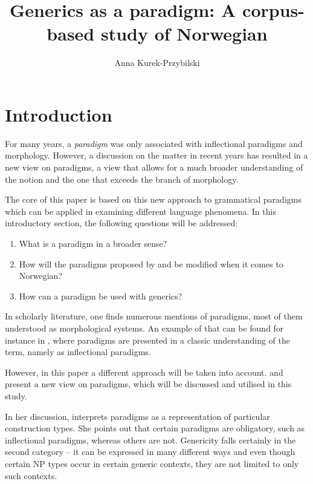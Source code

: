 \documentclass[output=paper]{langsci/langscibook}
\author{Anna Kurek-Przybilski\affiliation{Adam Mickiewicz University Poznań}}
\title{Generics as a paradigm: A corpus-based study of Norwegian}
\begin{document}
\maketitle
\section{Introduction}
For many years, a \textit{paradigm} was only associated with inflectional paradigms and morphology. However, a discussion on the matter in recent years has resulted in a new view on paradigms, a view that allows for a much broader understanding of the notion and the one that exceeds the branch of morphology.

The core of this paper is based on this new approach to grammatical paradigms which can be applied in examining different language phenomena. In this introductory section, the following questions will be addressed:

\begin{enumerate}[noitemsep]
    \item What is a paradigm in a broader sense?
    \item How will the paradigms proposed by \citet{Radden2007,Radden2009} and \citet{Pettersson1976} be modified when it comes to Norwegian?
    \item How can a paradigm be used with generics?
\end{enumerate}

In scholarly literature, one finds numerous mentions of paradigms, most of them understood as morphological systems. An example of that can be found for instance in \citet[55]{AckermanBlevinsMalouf2009}, where paradigms are presented in a classic understanding of the term, namely as inflectional paradigms.

However, in this paper a different approach will be taken into account. \citet{Diewald2009} and \citet{Nørgård-Sørensen2011} present a new view on paradigms, which will be discussed and utilised in this study.

In her discussion, \citet[445]{Diewald2009} interprets paradigms as a representation of particular construction types. She points out that certain paradigms are obligatory, such as inflectional paradigms, whereas others are not. Genericity falls certainly in the second category -- it can be expressed in many different ways and even though certain NP types occur in certain generic contexts, they are not limited to only such contexts.
\end{document}
